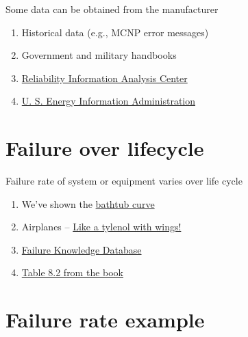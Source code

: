 \documentclass[aspectratio=1610,pdftex,dvipsnames,compress,xcolor={dvipsnames}]{beamer}
\begin{document}
\begin{frame}{Some data can be obtained from the manufacturer}
    \begin{enumerate}[series=outerlist,topsep=0pt,itemsep=21pt,leftmargin=*,label=(\arabic*)]
        \item[]Historical data (e.g., MCNP error messages)
        \item[]Government and military handbooks
        \item[]\href{https://www.quanterion.com/projects/reliability-information-analysis-center-riac/}{Reliability Information Analysis Center}
        \item[]\href{https://www.eia.gov/}{U. S. Energy Information Administration}
    \end{enumerate}
\end{frame}


\section{Failure over lifecycle}


\addtocounter{framenumber}{-1}
\begin{frame}{Failure rate of system or equipment varies over life cycle}
    \begin{enumerate}[series=outerlist,topsep=0pt,itemsep=21pt,leftmargin=*,label=(\arabic*)]
        \item[]We've shown the \href{https://qph.cf2.quoracdn.net/main-qimg-caa1625521dba35be9b7f9cad262c0e3-pjlq}{bathtub curve}
        \item[]Airplanes -- \href{https://youtu.be/PDtVP6R6C0g?si=vzNbIzAG3nHTZpRn}{Like a tylenol with wings!}
        \item[]\href{http://www.sozogaku.com/fkd/en/index.html}{Failure Knowledge Database}
        \item[]\href{https://docs.google.com/spreadsheets/d/11KeppAs0_VcJ_vLqMwpkflKbmLzNUPx13o_W31yFI8w/edit?usp=sharing}{Table 8.2 from the book}
    \end{enumerate}
\end{frame}


\section{Failure rate example}
\end{document}
